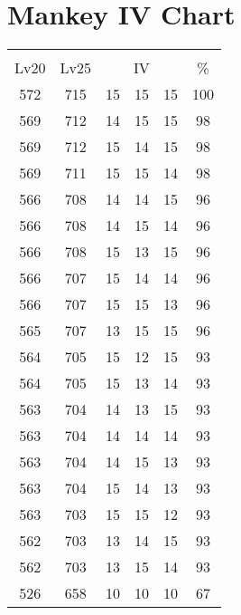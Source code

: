 \documentclass{article}%
\begin{document}
%
\normalsize%
\section{Mankey IV Chart}%
\label{sec:Mankey IV Chart}%
\renewcommand{\arraystretch}{1.5}%
\begin{tabular}{|c|c|c|c|c|c|}%
\hline%
\multicolumn{6}{|c|}{\textcolor{white}{ 
\linebreak{Mankey}
}%
\cellcolor{black}}\\%
\multicolumn{1}{|c}{Lv20}&\multicolumn{1}{c|}{Lv25}&\multicolumn{3}{c|}{IV}&\multicolumn{1}{|c|}{\%}\\%
\hline%
\rowcolor{color100}%
572&715&15&15&15&100\\%
\hline%
\rowcolor{color98}%
569&712&14&15&15&98\\%
\hline%
\rowcolor{color98}%
569&712&15&14&15&98\\%
\hline%
\rowcolor{color98}%
569&711&15&15&14&98\\%
\hline%
\rowcolor{color96}%
566&708&14&14&15&96\\%
\hline%
\rowcolor{color96}%
566&708&14&15&14&96\\%
\hline%
\rowcolor{color96}%
566&708&15&13&15&96\\%
\hline%
\rowcolor{color96}%
566&707&15&14&14&96\\%
\hline%
\rowcolor{color96}%
566&707&15&15&13&96\\%
\hline%
\rowcolor{color96}%
565&707&13&15&15&96\\%
\hline%
\rowcolor{color93}%
564&705&15&12&15&93\\%
\hline%
\rowcolor{color93}%
564&705&15&13&14&93\\%
\hline%
\rowcolor{color93}%
563&704&14&13&15&93\\%
\hline%
\rowcolor{color93}%
563&704&14&14&14&93\\%
\hline%
\rowcolor{color93}%
563&704&14&15&13&93\\%
\hline%
\rowcolor{color93}%
563&704&15&14&13&93\\%
\hline%
\rowcolor{color93}%
563&703&15&15&12&93\\%
\hline%
\rowcolor{color93}%
562&703&13&14&15&93\\%
\hline%
\rowcolor{color93}%
562&703&13&15&14&93\\%
\hline%
\rowcolor{color91}%
526&658&10&10&10&67\\%
\end{tabular}

%
\end{document}
